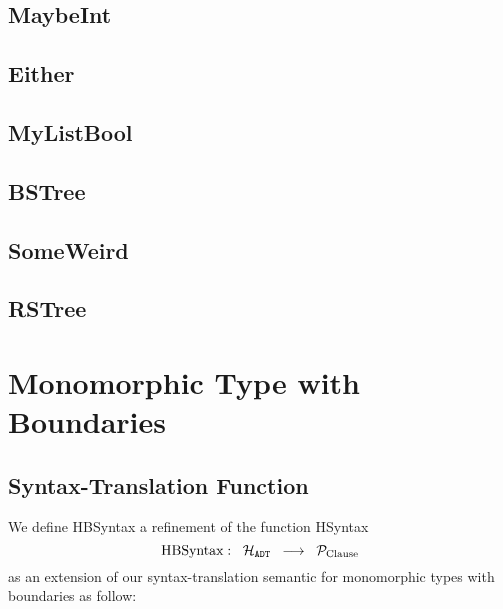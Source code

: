 \subsection{MaybeInt}\label{subsec:monomorphic-types-translation-maybeint}

\subsection{Either}\label{subsec:monomorphic-types-translation-either}

\subsection{MyListBool}\label{subsec:monomorphic-types-translation-mylistbool}

\subsection{BSTree}\label{subsec:monomorphic-types-translation-bstree}

\subsection{SomeWeird}\label{subsec:monomorphic-types-translation-someweird}

\subsection{RSTree}\label{subsec:monomorphic-types-translation-rstree}

\pagebreak
\section{Monomorphic Type with Boundaries}

\subsection{Syntax-Translation Function}\label{subsec:monomorphic-types-boundary-function}
We define HBSyntax a refinement of the function HSyntax $$\text{HBSyntax} :\;\; \mathcal{H}_{\texttt{ADT}} \;\; \longrightarrow \;\; \mathcal{P}_{\text{Clause}}$$ as an extension of our syntax-translation semantic for monomorphic types with boundaries as follow:\\
\small


\pagebreak
